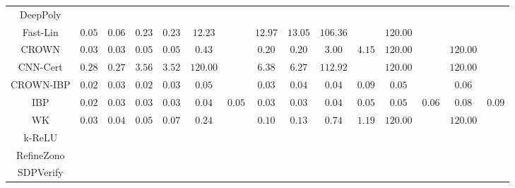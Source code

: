\begin{table*}
{\begin{tabular}{c|c|c|c|c|c|c|c|c|c|c|c|c|c|c}
     DeepPoly &               &               &               &               &               &               &               &               &               &               &               &               &               &               \\
     Fast-Lin &        $0.05$ &        $0.06$ &        $0.23$ &        $0.23$ &       $12.23$ &               &       $12.97$ &       $13.05$ &      $106.36$ &               &      $120.00$ &               &               &               \\
        CROWN &        $0.03$ &        $0.03$ &        $0.05$ &        $0.05$ &        $0.43$ &               &        $0.20$ &        $0.20$ &        $3.00$ &        $4.15$ &      $120.00$ &               &      $120.00$ &               \\
     CNN-Cert &        $0.28$ &        $0.27$ &        $3.56$ &        $3.52$ &      $120.00$ &               &        $6.38$ &        $6.27$ &      $112.92$ &               &      $120.00$ &               &      $120.00$ &               \\
    CROWN-IBP &        $0.02$ &        $0.03$ &        $0.02$ &        $0.03$ &        $0.05$ &               &        $0.03$ &        $0.04$ &        $0.04$ &        $0.09$ &        $0.05$ &               &        $0.06$ &               \\
          IBP &        $0.02$ &        $0.03$ &        $0.03$ &        $0.03$ &        $0.04$ &        $0.05$ &        $0.03$ &        $0.03$ &        $0.04$ &        $0.05$ &        $0.05$ &        $0.06$ &        $0.08$ &        $0.09$ \\
           WK &        $0.03$ &        $0.04$ &        $0.05$ &        $0.07$ &        $0.24$ &               &        $0.10$ &        $0.13$ &        $0.74$ &        $1.19$ &      $120.00$ &               &      $120.00$ &               \\
       k-ReLU &               &               &               &               &               &               &               &               &               &               &               &               &               &               \\
   RefineZono &               &               &               &               &               &               &               &               &               &               &               &               &               &               \\
    SDPVerify &               &               &               &               &               &               &               &               &               &               &               &               &               &               \\

\end{tabular}}
\end{table*}
